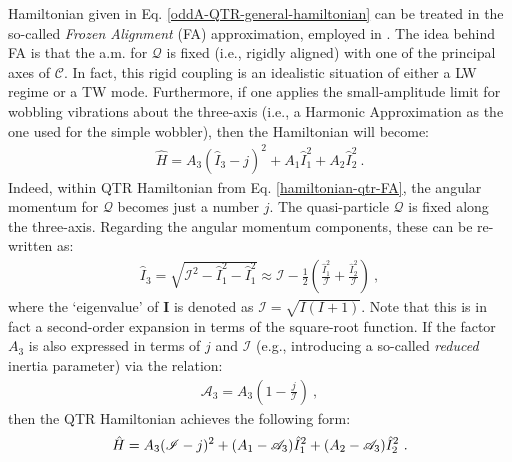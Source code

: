 Hamiltonian given in Eq. \ref{oddA-QTR-general-hamiltonian} can be treated in the so-called \emph{Frozen Alignment} (FA) approximation, employed in \cite{frauendorf2014transverse}. The idea behind FA is that the a.m. for $\mathcal{Q}$ is fixed (i.e., rigidly aligned) with one of the principal axes of $\mathscr{C}$. In fact, this rigid coupling is an idealistic situation of either a LW regime or a TW mode. Furthermore, if one applies the small-amplitude limit for wobbling vibrations about the three-axis (i.e., a Harmonic Approximation as the one used for the simple wobbler), then the Hamiltonian will become:
\begin{align}
    \hat{H}=A_3(\hat{I}_3-j)^2+A_1\hat{I}_1^2+A_2\hat{I}_2^2\ .
    \label{hamiltonian-qtr-FA}
\end{align}
Indeed, within QTR Hamiltonian from Eq. \ref{hamiltonian-qtr-FA}, the angular momentum for $\mathcal{Q}$ becomes just a number $j$. The quasi-particle $\mathcal{Q}$ is fixed along the three-axis. Regarding the angular momentum components, these can be re-written as:
\begin{align}
    \hat{I}_3=\sqrt{\mathscr{I}^2-\hat{I}_1^2-\hat{I}_1^2}\approx\mathscr{I}-\frac{1}{2}\left(\frac{\hat{I}_1^2}{\mathscr{I}}+\frac{\hat{I}_2^2}{\mathscr{I}}\right)\ ,
\end{align}
where the `eigenvalue' of $\mathbf{I}$ is denoted as $\mathscr{I}=\sqrt{I(I+1)}$. Note that this is in fact a second-order expansion in terms of the square-root function. If the factor $A_3$ is also expressed in terms of $j$ and $\mathscr{I}$ (e.g., introducing a so-called \emph{reduced} inertia parameter) via the relation:
\begin{align}
    \mathscr{A}_3=A_3\left(1-\frac{j}{\mathscr{I}}\right)\ ,
    \label{reduced-inertia-parameter-A3}
\end{align}
then the QTR Hamiltonian achieves the following form:
\begin{align}
    \hat{H}={\color{black}A_3(\mathscr{I}-j)^2}+{\color{black}(A_1-\mathscr{A}_3)\hat{I}_1^2+(A_2-\mathscr{A}_3)\hat{I}_2^2}\ .
    \label{HA-QTR-Hamiltonian}
\end{align}

